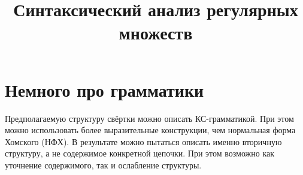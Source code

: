 \documentclass[a5paper]{article}
\title{Синтаксический анализ регулярных множеств}
\begin{document}




\section{Немного про грамматики}

Предполагаемую структуру свёртки можно описать КС-грамматикой. При этом можно использовать более 
выразительные конструкции, чем нормальная форма Хомского (НФХ). В результате можно пытаться описать 
именно вторичную структуру, а не содержимое конкретной цепочки. При этом возможно как уточнение 
содержимого, так и ослабление структуры.
\end{document}
